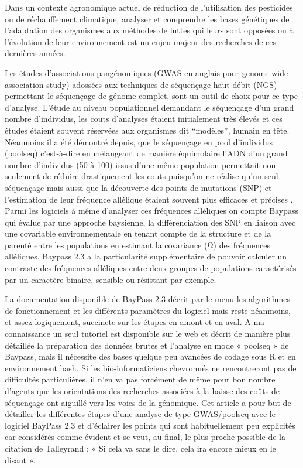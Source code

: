 \documentclass[
  openany]{book}
\begin{document}
Dans un contexte agronomique actuel de réduction de l'utilisation des pesticides ou de réchauffement climatique, analyser et comprendre les bases génétiques de l'adaptation des organismes aux méthodes de luttes qui leurs sont opposées ou à l'évolution de leur environnement est un enjeu majeur des recherches de ces dernières années.

Les études d'associations pangénomiques (GWAS en anglais pour genome-wide association study) adossées aux techniques de séquençage haut débit (NGS) permettant le séquençage de génome complet, sont un outil de choix pour ce type d'analyse. L'étude au niveau populationnel demandant le séquençage d'un grand nombre d'individus, les couts d'analyses étaient initialement très élevés et ces études étaient souvent réservées aux organismes dit ``modèles'', humain en tête. Néanmoins il a été démontré depuis, que le séquençage en pool d'individus (poolseq) c'est-à-dire en mélangeant de manière équimolaire l'ADN d'un grand nombre d'individus (50 à 100) issus d'une même population permettait non seulement de réduire drastiquement les couts puisqu'on ne réalise qu'un seul séquençage mais aussi que la découverte des points de mutations (SNP) et l'estimation de leur fréquence allélique étaient souvent plus efficaces et précises \citep{futschik_next_2010}. Parmi les logiciels à même d'analyser ces fréquences alléliques on compte Baypass \citep{gautier_genome-wide_2015} qui évalue par une approche baysienne, la différenciation des SNP en liaison avec une covariable environnementale en tenant compte de la structure et de la parenté entre les populations en estimant la covariance (Ω) des fréquences alléliques. Baypass 2.3 a la particularité supplémentaire de pouvoir calculer un contraste des fréquences alléliques entre deux groupes de populations caractérisés par un caractère binaire, sensible ou résistant par exemple.

La documentation disponible de BayPass 2.3 décrit par le menu les algorithmes de fonctionnement et les différents paramètres du logiciel mais reste néanmoins, et assez logiquement, succincte sur les étapes en amont et en aval. A ma connaissance un seul tutoriel est disponible sur le web \citep{nielsen_pool-seq_2020} et décrit de manière plus détaillée la préparation des données brutes et l'analyse en mode « poolseq » de Baypass, mais il nécessite des bases quelque peu avancées de codage sous R et en environnement bash. Si les bio-informaticiens chevronnés ne rencontreront pas de difficultés particulières, il n'en va pas forcément de même pour bon nombre d'agents que les orientations des recherches associées à la baisse des coûts de séquençage ont aiguillé vers les voies de la génomique. Cet article a pour but de détailler les différentes étapes d'une analyse de type GWAS/poolseq avec le logiciel BayPass 2.3 et d'éclairer les points qui sont habituellement peu explicités car considérés comme évident et se veut, au final, le plus proche possible de la citation de Talleyrand : « Si cela va sans le dire, cela ira encore mieux en le disant ».
\end{document}
